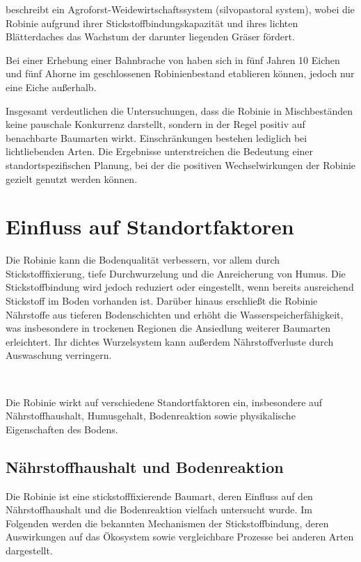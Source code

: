 \documentclass[twocolumn]{scrartcl}
\makeatletter
\newcommand{\summary}[1]{%
  \par %
  {\small\sffamily
    \noindent #1\par}
  \vspace{-0.4em}
  \noindent\makebox[\linewidth]{\rule{0.33\linewidth}{0.4pt}}\\[-1.2em]
  \@afterindentfalse\@afterheading
}
\makeatother
\begin{document}
\citet[p.~467, 586]{ashton2018silviculture} beschreibt ein
Agroforst-Weidewirtschaftssystem (silvopastoral system), wobei die
Robinie aufgrund ihrer Stickstoffbindungskapazität und ihres lichten
Blätterdaches das Wachstum der darunter liegenden Gräser fördert.

Bei einer Erhebung einer Bahnbrache von \citet{kowarik1996robinie}
haben sich in fünf Jahren 10 Eichen und fünf Ahorne im geschlossenen
Robinienbestand etablieren können, jedoch nur eine Eiche außerhalb.

Insgesamt verdeutlichen die Untersuchungen, dass die Robinie in
Mischbeständen keine pauschale Konkurrenz darstellt, sondern in der
Regel positiv auf benachbarte Baumarten wirkt. Einschränkungen
bestehen lediglich bei lichtliebenden Arten. Die Ergebnisse
unterstreichen die Bedeutung einer standortspezifischen Planung, bei
der die positiven Wechselwirkungen der Robinie gezielt genutzt werden
können.


\section{Einfluss auf Standortfaktoren}

\summary{Die Robinie kann die Bodenqualität verbessern, vor allem durch Stickstofffixierung, tiefe Durchwurzelung und die Anreicherung von Humus. Die Stickstoffbindung wird jedoch reduziert oder eingestellt, wenn bereits ausreichend Stickstoff im Boden vorhanden ist. Darüber hinaus erschließt die Robinie Nährstoffe aus tieferen Bodenschichten und erhöht die Wasserspeicherfähigkeit, was insbesondere in trockenen Regionen die Ansiedlung weiterer Baumarten erleichtert. Ihr dichtes Wurzelsystem kann außerdem Nährstoffverluste durch Auswaschung verringern.}

Die Robinie wirkt auf verschiedene Standortfaktoren ein, insbesondere
auf Nährstoffhaushalt, Humusgehalt, Bodenreaktion sowie physikalische
Eigenschaften des Bodens.

\subsection{Nährstoffhaushalt und Bodenreaktion}

Die Robinie ist eine stickstofffixierende Baumart, deren Einfluss auf
den Nährstoffhaushalt und die Bodenreaktion vielfach untersucht
wurde. Im Folgenden werden die bekannten Mechanismen der
Stickstoffbindung, deren Auswirkungen auf das Ökosystem sowie
vergleichbare Prozesse bei anderen Arten dargestellt.
\end{document}
